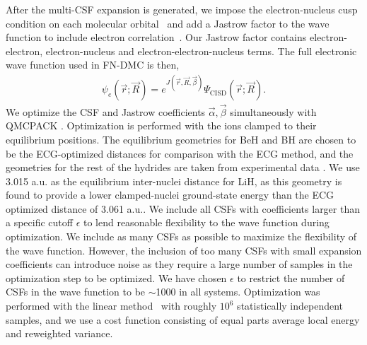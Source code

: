 \documentclass[pra,superscriptaddress,groupedaddress,twocolumn]{revtex4-1}
\begin{document}
After the multi-CSF expansion is generated, we impose the electron-nucleus cusp condition on each molecular orbital~\cite{cusp} and add a Jastrow factor to the wave function to include electron correlation~\cite{Kato}. Our Jastrow factor contains electron-electron, electron-nucleus and electron-electron-nucleus terms. The full electronic wave function used in FN-DMC is then,
\begin{align}
\psi_e(\vec{r};\vec{R})=e^{J(\vec{r},\vec{R},\vec{\beta})}\Psi_{\text{CISD}}(\vec{r};\vec{R})\label{eq:psie}.
\end{align}
We optimize the CSF and Jastrow coefficients $\vec{\alpha},\vec{\beta}$ simultaneously with QMCPACK \cite{QMCPACK_Kim,QMCPACK_Esler}. Optimization is performed with the ions clamped to their equilibrium positions. The equilibrium geometries for BeH and BH are chosen to be the ECG-optimized distances for comparison with the ECG method, and the geometries for the rest of the hydrides are taken from experimental data \cite{CCCBDB}. We use 3.015 a.u. as the equilibrium inter-nuclei distance for LiH, as this geometry is found to provide a lower clamped-nuclei ground-state energy than the ECG optimized distance of 3.061 a.u.. We include all CSFs with coefficients larger than a specific cutoff $\epsilon$ to lend reasonable flexibility to the wave function during optimization. We include as many CSFs as possible to maximize the flexibility of the wave function. However, the inclusion of too many CSFs with small expansion coefficients can introduce noise as they require a large number of samples in the optimization step to be optimized. We have chosen $\epsilon$ to restrict the number of CSFs in the wave function to be $\sim$1000 in all systems. Optimization was performed with the linear method~\cite{Umrigar_Linear} with roughly $10^6$ statistically independent samples, and we use a cost function consisting of equal parts average local energy and reweighted variance.

%
\end{document}
